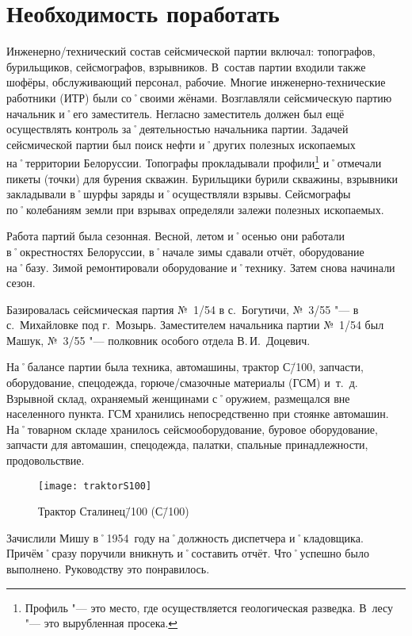 ﻿\chapter{Необходимость поработать}

Инженерно\-/технический состав сейсмической партии включал: топографов, бурильщиков, сейсмографов, взрывников. В~состав партии входили также шофёры, обслуживающий персонал, рабочие. Многие инженерно-технические работники (ИТР) были со˚своими жёнами. Возглавляли сейсмическую партию начальник и˚его заместитель. Негласно заместитель должен был ещё осуществлять контроль за˚деятельностью начальника партии. Задачей сейсмической партии был поиск нефти и˚других полезных ископаемых на˚территории Белоруссии. Топографы прокладывали профили\footnote{Профиль "--- это место, где осуществляется геологическая разведка. В~лесу "--- это вырубленная просека.}  и˚отмечали пикеты (точки) для бурения скважин. Бурильщики бурили скважины, взрывники закладывали в˚шурфы заряды и˚осуществляли взрывы. Сейсмографы по˚колебаниям земли при взрывах определяли залежи полезных ископаемых.

Работа партий была сезонная. Весной, летом и˚осенью они работали в˚окрестностях Белоруссии, в˚начале зимы сдавали отчёт, оборудование на˚базу. Зимой ремонтировали оборудование и˚технику. Затем снова начинали сезон.

Базировалась сейсмическая партия №~1/54 в с.~Богутичи, №~3/55 "--- в с.~Михайловке под г.~Мозырь. Заместителем начальника партии №~1/54 был Машук, №~3/55 "--- полковник особого отдела В.\,И.~Доцевич.

На˚балансе партии была техника, автомашины, трактор С\=/100, запчасти, оборудование, спецодежда, горюче\-/смазочные материалы (ГСМ) и~т.~д. Взрывной склад, охраняемый женщинами с˚оружием, размещался вне населенного пункта. ГСМ хранились непосредственно при стоянке автомашин. На˚товарном складе хранилось сейсмооборудование, буровое оборудование, запчасти для автомашин, спецодежда, палатки, спальные принадлежности, продовольствие.

\begin{wrapfigure}{O}{.4\textwidth}
\centering
\texttt{[image: traktorS100]}
\caption[Трактор Сталинец\=/100 (С\=/100)]{Трактор Сталинец\=/100 (С\=/100)\footnotemark}
\label{fig:traktorS100}
\end{wrapfigure}

Зачислили Мишу в˚1954~году на˚должность диспетчера и˚кладовщика. Причём˚сразу поручили вникнуть и˚составить отчёт. Что˚успешно было выполнено. Руководству это понравилось.

